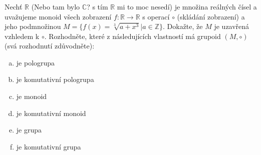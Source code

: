\subsubsection{}
Nechť $\mathbb{R}$ (Nebo tam bylo $\mathbb{C}$? s tím $\mathbb{R}$ mi to moc
nesedí) je množina reálných čísel a uvažujeme monoid všech zobrazení $f:
\mathbb{R} \rightarrow \mathbb{R}$ s operací $\circ$ (skládání zobrazení) a jeho
podmnožinou $M = \{f(x) = \sqrt[3]{a+x^3} | a \in \mathbb{Z}\}$.
Dokažte, že $M$ je uzavřená vzhledem k $\circ$.
Rozhodněte, které z následujících vlastností má grupoid $(M, \circ)$ (svá
rozhodnutí zdůvodněte):
\begin{enumerate}[a)]
	\item je pologrupa
	\item je komutativní pologrupa
	\item je monoid
	\item je komutativní monoid
	\item je grupa
	\item je komutativní grupa
\end{enumerate}
